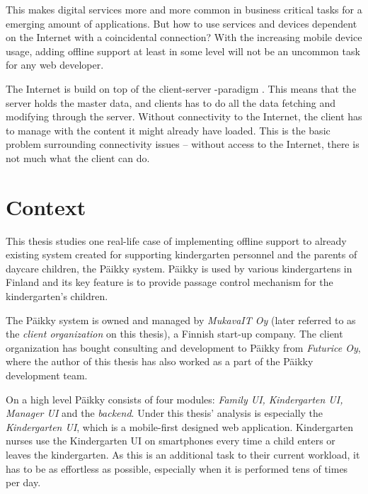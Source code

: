 This makes digital services more and more common in business critical tasks for a emerging amount of applications. But how to use services and devices dependent on the Internet with a coincidental connection? With the increasing mobile device usage, adding offline support at least in some level will not be an uncommon task for any web developer.

The Internet is build on top of the client-server -paradigm \cite{berson_client-server_1992}. This means that the server holds the master data, and clients has to do all the data fetching and modifying through the server. Without connectivity to the Internet, the client has to manage with the content it might already have loaded. This is the basic problem surrounding connectivity issues -- without access to the Internet, there is not much what the client can do.






\section{Context}

This thesis studies one real-life case of implementing offline support to already existing system created for supporting kindergarten personnel and the parents of daycare children, the Päikky system. Päikky is used by various kindergartens in Finland and its key feature is to provide passage control mechanism for the kindergarten's children.

The Päikky system is owned and managed by \textit{MukavaIT Oy} (later referred to as the \textit{client organization} on this thesis), a Finnish start-up company. The client organization has bought consulting and development to  Päikky from \textit{Futurice Oy}, where the author of this thesis has also worked as a part of the Päikky development team.

On a high level Päikky consists of four modules: \textit{Family UI, Kindergarten UI, Manager UI} and the \textit{backend}. Under this thesis' analysis is especially the \textit{Kindergarten UI}, which is a mobile-first designed web application. Kindergarten nurses use the Kindergarten UI on smartphones every time a child enters or leaves the kindergarten. As this is an additional task to their current workload, it has to be as effortless as possible, especially when it is performed tens of times per day. %

